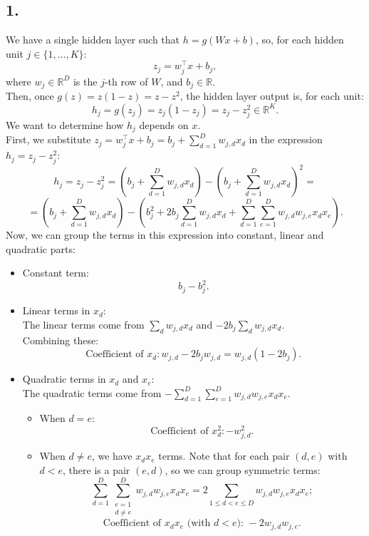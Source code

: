 \documentclass[12pt,a4paper]{article}
\begin{document}
    \subsection{1.}
        We have a single hidden layer such that \(h = g(Wx+b)\), so, for each hidden unit \(j \in \{1,\ldots,K\}\):
        \[z_j = w_j^\top x + b_j,\]
        where \(w_j \in \mathbb{R}^D\) is the \(j\)-th row of \(W\), and \(b_j \in \mathbb{R}\). \\
        Then, once \(g(z) = z(1 - z) = z - z^2\), the hidden layer output is, for each unit:
        \[h_j = g(z_j) = z_j(1 - z_j) = z_j - z_j^2 \in \mathbb{R}^K.\]
        We want to determine how \(h_j\) depends on \(x\). \\
        First, we substitute \(z_j = w_j^\top x + b_j = b_j + \sum_{d=1}^D w_{j,d} x_d\) in the expression \(h_j = z_j - z_j^2\):
        \[h_j = z_j - z_j^2 = \left(b_j + \sum_{d=1}^D w_{j,d} x_d\right) - \left(b_j + \sum_{d=1}^D w_{j,d}x_d\right)^2 =\]
        \[= \left(b_j + \sum_{d=1}^D w_{j,d} x_d\right) - \left(b_j^2 + 2 b_j \sum_{d=1}^D w_{j,d}x_d + \sum_{d=1}^D\sum_{e=1}^D w_{j,d} w_{j,e} x_d x_e \right).\]
        Now, we can group the terms in this expression into constant, linear and quadratic parts:
       \begin{itemize}
            \item Constant term: \[b_j - b_j^2.\]
           
            \item Linear terms in \(x_d\): \\
                The linear terms come from \(\sum_d w_{j,d} x_d\) and \(- 2 b_j \sum_d w_{j,d} x_d\).\\
                Combining these:
                \[\text{Coefficient of } x_d: w_{j,d} - 2 b_j w_{j,d} = w_{j,d}(1 - 2b_j).\]
            
            \item Quadratic terms in \(x_d\) and \(x_e\): \\
                The quadratic terms come from \(-\sum_{d=1}^D\sum_{e=1}^D w_{j,d} w_{j,e} x_d x_e\).
                
                \begin{itemize}
                    \item When \(d = e\):
                        \[\text{Coefficient of } x_d^2: -w_{j,d}^2.\]
                    
                    \item When \(d \neq e\), we have \(x_d x_e\) terms. Note that for each pair \((d, e)\) with \(d < e\), there is a pair \((e, d)\), so we can group symmetric terms:
                        \[\sum_{d=1}^D \sum_{\substack{e = 1 \\ d \neq e}}^D w_{j,d} w_{j,e} x_d x_e = 2\sum_{1 \leq d < e \leq D} w_{j,d} w_{j,e} x_d x_e;\]
                        \[\text{Coefficient of } x_d x_e \text{ (with } d<e \text{): } -2 w_{j,d} w_{j,e}.\]
                \end{itemize}            
        \end{itemize}
\end{document}
